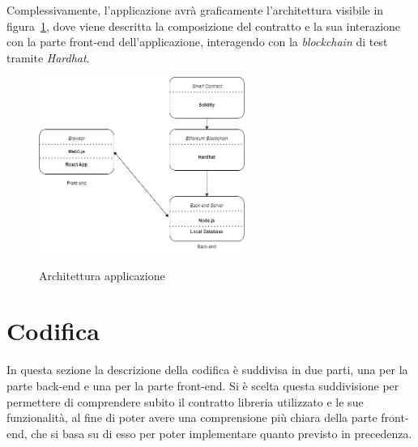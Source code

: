 \newpage
Complessivamente, l'applicazione avrà graficamente l'architettura visibile in figura~\ref{fig:architettura}, dove viene descritta la composizione del contratto 
e la sua interazione con la parte front-end dell'applicazione, interagendo con la \textit{blockchain} di test tramite \textit{Hardhat}.
\begin{figure}[ht]
    \centering
    \includegraphics[width=0.6\textwidth, alt={Descrizione dell'architettura dell'applicazione}]{immagini/architettura.png}
    \caption{Architettura applicazione}\label{fig:architettura}
\end{figure}

\section{Codifica}\label{sec:codifica-requisiti}

In questa sezione la descrizione della codifica è suddivisa in due parti, una per la parte back-end e una per la parte front-end.
Si è scelta questa suddivisione per permettere di comprendere subito il contratto libreria utilizzato e le sue funzionalità,
al fine di poter avere una comprensione più chiara della parte front-end, che si basa su di esso per poter implementare quanto previsto in precedenza.

